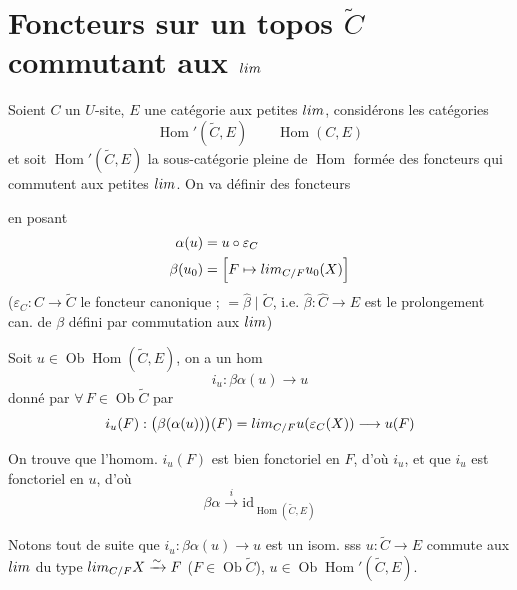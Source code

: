 \documentclass[11pt,a4paper]{article}
\begin{document}
\section*{Foncteurs sur un topos $\widetilde{C}$ commutant aux $\varinjlim$}

Soient $C$ un $U$-site, $E$ une catégorie aux petites $\varinjlim$,
considérons les catégories
\[
\operatorname{Hom}'(\widetilde{C}, E)
\qquad
\operatorname{Hom}(C, E)
\]
et soit $\operatorname{Hom}'(\widetilde{C},E)$  la
sous-catégorie pleine de $\operatorname{Hom}$ formée des foncteurs qui
commutent aux petites $\varinjlim$. On va définir des foncteurs


en posant
\begin{align}
\alpha(u) &= u \circ \varepsilon_{C} \nonumber\\
\beta(u_{0}) &= \Bigl[F \mapsto \varinjlim_{C/F} u_{0}(X)\Bigr] \nonumber
\end{align}
($\varepsilon_{C} : C \to \widetilde{C}$ le foncteur canonique ; $=
\widehat{\beta} \mid \widetilde{C}$, i.e. $\widehat{\beta} : \widehat{C} \to E$
est le prolongement can. de $\beta$ défini par commutation aux $\varinjlim$)

Soit $u \in \operatorname{Ob} \operatorname{Hom}(\widetilde{C},E)$, on a un hom
\[
i_{u} : \beta\alpha(u) \longrightarrow u
\]
donné par $\forall\, F \in \operatorname{Ob} \widetilde{C}$ par
\[
i_{u}(F) : \bigl(\beta(\alpha(u))\bigr)(F)
= \varinjlim_{C/F} u(\varepsilon_{C}(X)) \longrightarrow u(F)
\]

On trouve que l'homom. $i_{u}(F)$ est bien fonctoriel en $F$, d'où $i_{u}$, et
que $i_{u}$ est fonctoriel en $u$, d'où
\[
\boxed{\;\beta\alpha \xrightarrow{\ i\ } \mathrm{id}_{\operatorname{Hom}(\widetilde{C},E)}\;}
\]

Notons tout de suite que \struck{\ill{}} $i_{u} : \beta\alpha(u) \to u$ est un
isom. sss $u : \widetilde{C} \to E$ commute aux $\varinjlim$ du type
$\varinjlim_{C/F} X \xrightarrow{\sim} F$ ($F \in \operatorname{Ob}
\widetilde{C}$), \struck{\ill{}}  $u \in \operatorname{Ob}
\operatorname{Hom}'(\widetilde{C}, E)$.
\end{document}
